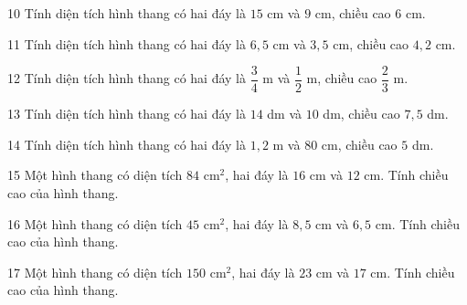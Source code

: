 \gap
\begin{probbox}{10}{\relax}
Tính diện tích hình thang có hai đáy là $15$ cm và $9$ cm, chiều cao $6$ cm.
\end{probbox}
\gap
\begin{probbox}{11}{\relax}
Tính diện tích hình thang có hai đáy là $6{,}5$ cm và $3{,}5$ cm, chiều cao $4{,}2$ cm.
\end{probbox}
\gap
\begin{probbox}{12}{\relax}
Tính diện tích hình thang có hai đáy là $\dfrac34$ m và $\dfrac12$ m, chiều cao $\dfrac23$ m.
\end{probbox}
\gap
\begin{probbox}{13}{\relax}
Tính diện tích hình thang có hai đáy là $14$ dm và $10$ dm, chiều cao $7{,}5$ dm.
\end{probbox}
\gap
\begin{probbox}{14}{\relax}
Tính diện tích hình thang có hai đáy là $1{,}2$ m và $80$ cm, chiều cao $5$ dm.
\end{probbox}
\gap
\begin{probbox}{15}{\relax}
Một hình thang có diện tích $84$ cm$^2$, hai đáy là $16$ cm và $12$ cm. Tính chiều cao của hình thang.
\end{probbox}
\gap
\begin{probbox}{16}{\relax}
Một hình thang có diện tích $45$ cm$^2$, hai đáy là $8{,}5$ cm và $6{,}5$ cm. Tính chiều cao của hình thang.
\end{probbox}
\gap
\begin{probbox}{17}{\relax}
Một hình thang có diện tích $150$ cm$^2$, hai đáy là $23$ cm và $17$ cm. Tính chiều cao của hình thang.
\end{probbox}
